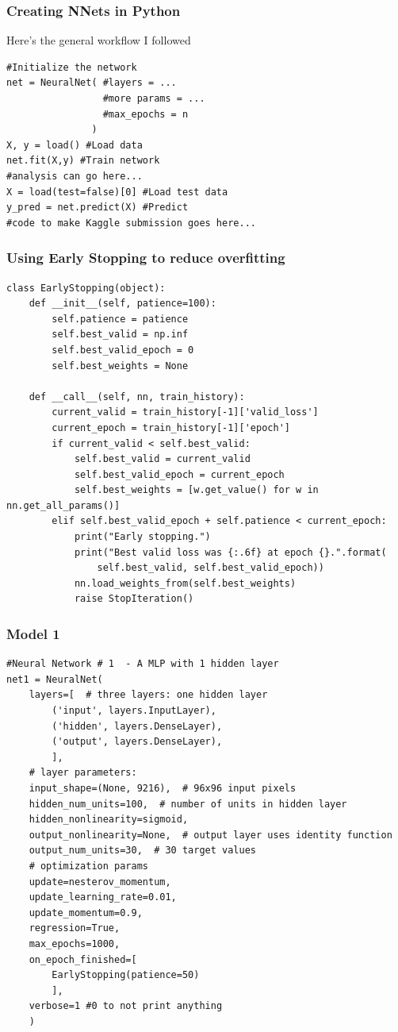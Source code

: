\documentclass{beamer}
\begin{document}

\begin{frame}[fragile]
\frametitle{Creating NNets in Python}
\begin{block}{Here's the general workflow I followed}
\begin{verbatim}
#Initialize the network
net = NeuralNet( #layers = ...
                 #more params = ...
                 #max_epochs = n
               )
X, y = load() #Load data
net.fit(X,y) #Train network
#analysis can go here...
X = load(test=false)[0] #Load test data
y_pred = net.predict(X) #Predict
#code to make Kaggle submission goes here...
\end{verbatim}
\end{block}
\end{frame}

\begin{frame}[fragile]
\frametitle{Using Early Stopping to reduce overfitting}
\begin{verbatim}
class EarlyStopping(object):
    def __init__(self, patience=100):
        self.patience = patience
        self.best_valid = np.inf
        self.best_valid_epoch = 0
        self.best_weights = None

    def __call__(self, nn, train_history):
        current_valid = train_history[-1]['valid_loss']
        current_epoch = train_history[-1]['epoch']
        if current_valid < self.best_valid:
            self.best_valid = current_valid
            self.best_valid_epoch = current_epoch
            self.best_weights = [w.get_value() for w in nn.get_all_params()]
        elif self.best_valid_epoch + self.patience < current_epoch:
            print("Early stopping.")
            print("Best valid loss was {:.6f} at epoch {}.".format(
                self.best_valid, self.best_valid_epoch))
            nn.load_weights_from(self.best_weights)
            raise StopIteration()
\end{verbatim}
\end{frame}

\begin{frame}[fragile]
\frametitle{Model 1}
\begin{verbatim}
#Neural Network # 1  - A MLP with 1 hidden layer
net1 = NeuralNet(
    layers=[  # three layers: one hidden layer
        ('input', layers.InputLayer),
        ('hidden', layers.DenseLayer),
        ('output', layers.DenseLayer),
        ],
    # layer parameters:
    input_shape=(None, 9216),  # 96x96 input pixels
    hidden_num_units=100,  # number of units in hidden layer
    hidden_nonlinearity=sigmoid,
    output_nonlinearity=None,  # output layer uses identity function
    output_num_units=30,  # 30 target values
    # optimization params
    update=nesterov_momentum,
    update_learning_rate=0.01,
    update_momentum=0.9,
    regression=True, 
    max_epochs=1000,
    on_epoch_finished=[
        EarlyStopping(patience=50)
        ],
    verbose=1 #0 to not print anything
    )
\end{verbatim}
\end{frame}
\end{document}
